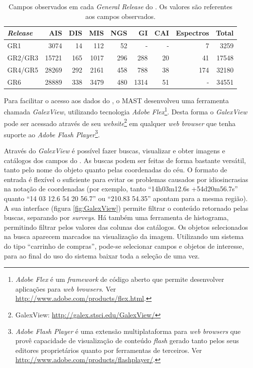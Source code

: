 \begin{table}
	\caption[Campos observados em cada {\em General Release} do \galex.]{Campos
	observados em cada {\em General Release} do \galex. Os valores são referentes
	aos campos observados.}
	\begin{tabular}{l r r r r r r r r}
		{\em Release} & AIS   & DIS & MIS  & NGS & GI   & CAI & Espectros & Total \\
		\midrule
		GR1           & 3074  & 14  & 112  & 52  & -    & -   & 7         & 3259  \\
		GR2/GR3       & 15721 & 165 & 1017 & 296 & 288  & 20  & 41        & 17548 \\
		GR4/GR5       & 28269 & 292 & 2161 & 458 & 788  & 38  & 174       & 32180 \\
		GR6           & 28889 & 338 & 3479 & 480 & 1314 & 51  & -         & 34551 \\
	\end{tabular}
	\label{tab:GalexReleases}
\end{table}

Para facilitar o acesso aos dados do \galex, o MAST desenvolveu uma ferramenta
chamada {\em GalexView}, utilizando tecnologia {\em Adobe Flex}\footnote{{\em
Adobe Flex} é um {\em framework} de código aberto que permite desenvolver
aplicações para {\em web browsers}. Ver
\url{http://www.adobe.com/products/flex.html}.}. Desta forma o {\em GalexView }
pode ser acessado através de seu {\em website}\footnote{GalexView:
\url{http://galex.stsci.edu/GalexView/}} em qualquer {\em web browser} que tenha
suporte ao {\em Adobe Flash Player}\footnote{{\em Adobe Flash Player} é uma
extensão multiplataforma para {\em web browsers} que provê capacidade de
visualização de conteúdo {\em flash} gerado tanto pelos seus editores
proprietários quanto por ferramentas de terceiros. Ver
\url{http://www.adobe.com/products/flashplayer/}.}.

Através do {\em GalexView} é possível fazer buscas, visualizar e obter imagens e
catálogos dos campos do \galex. As buscas podem ser feitas de forma bastante
versátil, tanto pelo nome do objeto quanto pelas coordenadas do céu. O formato
de entrada é flexível o suficiente para evitar os problemas causados por
idiosincrasias na notação de coordenadas (por exemplo, tanto ``14h03m12.6s
+54d20m56.7s'' quanto ``14 03 12.6 54 20 56.7'' ou ``210.83 54.35'' apontam para
a mesma região). A sua interface (figura \ref{fig:GalexView}) permite filtrar o
conteúdo retornado pelas buscas, separando por {\em surveys}. Há também uma
ferramenta de histograma, permitindo filtrar pelos valores das colunas dos
catálogos. Os objetos selecionados na busca aparecem marcados na visualização da
imagem. Utilizando um sistema do tipo ``carrinho de compras'', pode-se
selecionar campos e objetos de interesse, para ao final do uso do sistema baixar
toda a seleção de uma vez.

